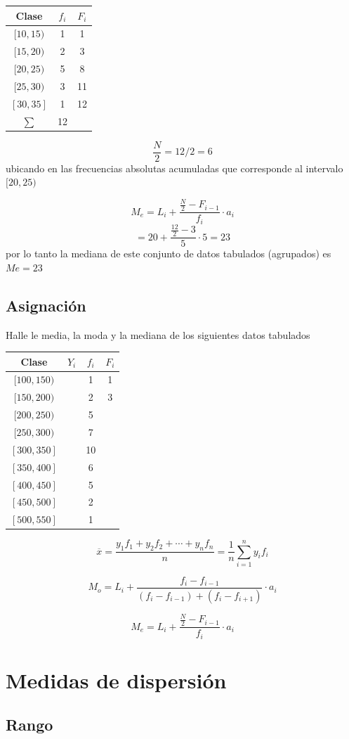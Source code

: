 \documentclass[10pt,]{krantz}
\theoremstyle{definition}
\theoremstyle{definition}
\theoremstyle{definition}
\theoremstyle{definition}
\theoremstyle{remark}
\begin{document}
\begin{longtable}[]{@{}ccc@{}}
\toprule
Clase & \(f_i\) & \(F_i\)\tabularnewline
\midrule
\endhead
\([10,15)\) & 1 & 1\tabularnewline
\([15,20)\) & 2 & 3\tabularnewline
\([20,25)\) & 5 & 8\tabularnewline
\([25,30)\) & 3 & 11\tabularnewline
\([30,35]\) & 1 & 12\tabularnewline
\(\sum\) & 12 &\tabularnewline
\bottomrule
\end{longtable}

\[\frac{N}{2}=12/2=6\] ubicando en las frecuencias absolutas acumuladas que corresponde al intervalo \([20,25)\)

\[  M_e=L_{i}+\frac{\frac{N}{2}-F_{i-1}}{f_{i}}\cdot a_{i}\] \[  =20+\frac{\frac{12}{2}-3}{5}\cdot 5=23\] por lo tanto la mediana de este conjunto de datos tabulados (agrupados) es \(Me=23\)

\hypertarget{asignaciuxf3n}{%
\section{Asignación}\label{asignaciuxf3n}}

Halle le media, la moda y la mediana de los siguientes datos tabulados

\begin{longtable}[]{@{}cccc@{}}
\toprule
Clase & \(Y_i\) & \(f_i\) & \(F_i\)\tabularnewline
\midrule
\endhead
\([100,150)\) & & 1 & 1\tabularnewline
\([150,200)\) & & 2 & 3\tabularnewline
\([200,250)\) & & 5 &\tabularnewline
\([250,300)\) & & 7 &\tabularnewline
\([300,350]\) & & 10 &\tabularnewline
\([350,400]\) & & 6 &\tabularnewline
\([400,450]\) & & 5 &\tabularnewline
\([450,500]\) & & 2 &\tabularnewline
\([500,550]\) & & 1 &\tabularnewline
\bottomrule
\end{longtable}

\[\overline{x}=\frac{y_1f_1+y_2f_2+\cdots+y_nf_n}{n}=\frac{1}{n}\sum_{i=1}^ny_if_i\]

\[ M_o=L_i+\frac{f_i-f_{i-1}}{(f_i-f_{i-1})+(f_i-f_{i+1})}\cdot a_i\]

\[  M_e=L_{i}+\frac{\frac{N}{2}-F_{i-1}}{f_{i}}\cdot a_{i}\]

\hypertarget{medidas-de-dispersiuxf3n}{%
\chapter{Medidas de dispersión}\label{medidas-de-dispersiuxf3n}}

\hypertarget{rango}{%
\section{Rango}\label{rango}}
\end{document}
